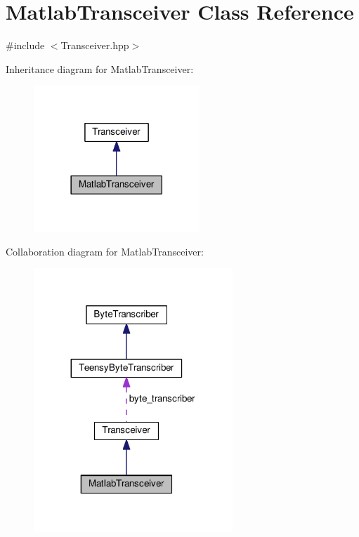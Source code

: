 \hypertarget{classMatlabTransceiver}{}\section{Matlab\+Transceiver Class Reference}
\label{classMatlabTransceiver}


{\ttfamily \#include $<$Transceiver.\+hpp$>$}



Inheritance diagram for Matlab\+Transceiver\+:\nopagebreak
\begin{figure}[H]
\begin{center}
\leavevmode
\includegraphics[width=177pt]{classMatlabTransceiver__inherit__graph}
\end{center}
\end{figure}


Collaboration diagram for Matlab\+Transceiver\+:
\nopagebreak
\begin{figure}[H]
\begin{center}
\leavevmode
\includegraphics[width=212pt]{classMatlabTransceiver__coll__graph}
\end{center}
\end{figure}
